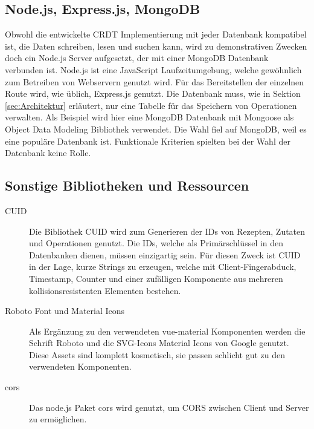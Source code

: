 \documentclass[a4paper, 12pt]{scrreprt}
\begin{document}
\begin{minipage}{\linewidth}
	
\end{minipage}

\begin{minipage}{\linewidth}
	
\end{minipage}

\subsection{Node.js, Express.js, MongoDB}
Obwohl die entwickelte CRDT Implementierung mit jeder Datenbank kompatibel ist, die Daten schreiben, lesen und suchen kann, wird zu demonstrativen Zwecken doch ein Node.js Server aufgesetzt, der mit einer MongoDB Datenbank verbunden ist. Node.js ist eine JavaScript Laufzeitumgebung, welche gewöhnlich zum Betreiben von Webservern genutzt wird. Für das Bereitstellen der einzelnen Route wird, wie üblich, Express.js genutzt. Die Datenbank muss, wie in Sektion \ref{sec:Architektur} erläutert, nur eine Tabelle für das Speichern von Operationen verwalten. Als Beispiel wird hier eine MongoDB Datenbank mit Mongoose als Object Data Modeling Bibliothek verwendet. Die Wahl fiel auf MongoDB, weil es eine populäre Datenbank ist. Funktionale Kriterien spielten bei der Wahl der Datenbank keine Rolle. 

\subsection{Sonstige Bibliotheken und Ressourcen}

\begin{description}
	\item[CUID] Die Bibliothek CUID wird zum Generieren der IDs von Rezepten, Zutaten und Operationen genutzt. Die IDs, welche als Primärschlüssel in den Datenbanken dienen, müssen einzigartig sein. Für diesen Zweck ist CUID in der Lage, kurze Strings zu erzeugen, welche mit Client-Fingerabduck, Timestamp, Counter und einer zufälligen Komponente aus mehreren kollisionsresistenten Elementen bestehen.
	\item[Roboto Font und Material Icons] Als Ergänzung zu den verwendeten vue-material Komponenten werden die Schrift Roboto und die SVG-Icons Material Icons von Google genutzt. Diese Assets sind komplett kosmetisch, sie passen schlicht gut zu den verwendeten Komponenten.
	\item[cors] Das node.js Paket cors wird genutzt, um \ac{CORS} zwischen Client und Server zu ermöglichen.
\end{description}
\end{document}
